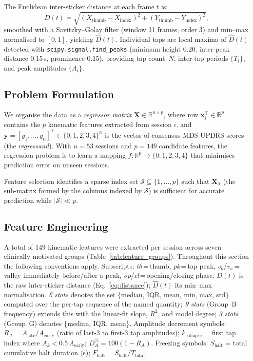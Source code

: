 \documentclass[12pt, a4paper]{article}
\begin{document}
The Euclidean inter-sticker distance at each frame $t$ is:
\begin{equation}
    D(t) = \sqrt{(X_{\mathrm{thumb}} - X_{\mathrm{index}})^{2}
                 + (Y_{\mathrm{thumb}} - Y_{\mathrm{index}})^{2}},
    \label{eq:distance}
\end{equation}
smoothed with a Savitzky--Golay filter (window 11 frames, order 3) and min--max
normalised to $[0,1]$, yielding $\hat{D}(t)$.
Individual taps are local maxima of $\hat{D}(t)$ detected with
\texttt{scipy.signal.find\_peaks} (minimum height 0.20, inter-peak distance 0.15\,s,
prominence 0.15), providing tap count~$N$, inter-tap periods $\{T_i\}$, and peak
amplitudes $\{A_i\}$.

\subsection{Problem Formulation}

We organise the data as a \emph{regressor matrix} $\mathbf{X} \in \mathbb{R}^{n \times p}$,
where row $\mathbf{x}_i^{\top} \in \mathbb{R}^p$ contains the $p$ kinematic features
extracted from session $i$, and $\mathbf{y} = [y_1, \ldots, y_n]^{\top} \in \{0,1,2,3,4\}^n$
is the vector of consensus MDS-UPDRS scores (the \emph{regressand}).
With $n = 53$ sessions and $p = 149$ candidate features, the regression problem is to
learn a mapping $f: \mathbb{R}^{p} \to \{0,1,2,3,4\}$ that minimises prediction error
on unseen sessions.

Feature selection identifies a sparse index set $\mathcal{S} \subseteq \{1,\ldots,p\}$
such that $\mathbf{X}_{\mathcal{S}}$ (the sub-matrix formed by the columns indexed by
$\mathcal{S}$) is sufficient for accurate prediction while $|\mathcal{S}| \ll p$.

\subsection{Feature Engineering}

A total of 149 kinematic features were extracted per session across seven
clinically motivated groups (Table~\ref{tab:feature_groups}).
Throughout this section the following conventions apply.
Subscripts: \emph{th}\,=\,thumb, \emph{pk}\,=\,tap peak,
$v_b$/$v_a$\,=\,valley immediately before/after a peak,
\emph{op}/\emph{cl}\,=\,opening/closing phase.
$D(t)$ is the raw inter-sticker distance (Eq.~\ref{eq:distance});
$\hat{D}(t)$ its min--max normalisation.
\emph{6 stats} denotes the set \{median, IQR, mean, min, max, std\} computed
over the per-tap sequence of the named quantity;
\emph{9 stats} (Group~B frequency) extends this with the linear-fit slope,
$R^2$, and model degree;
\emph{3 stats} (Group~G) denotes \{median, IQR, mean\}.
Amplitude decrement symbols: $R_A = A_\mathrm{late}/A_\mathrm{early}$
(ratio of last-3 to first-3 tap amplitudes);
$k_\mathrm{collapse}$ = first tap index where $A_k < 0.5\,A_\mathrm{early}$;
$D_A^{\%} = 100(1 - R_A)$.
Freezing symbols: $S_\mathrm{halt}$ = total cumulative halt duration (s);
$F_\mathrm{halt} = S_\mathrm{halt}/T_\mathrm{total}$.
\end{document}

